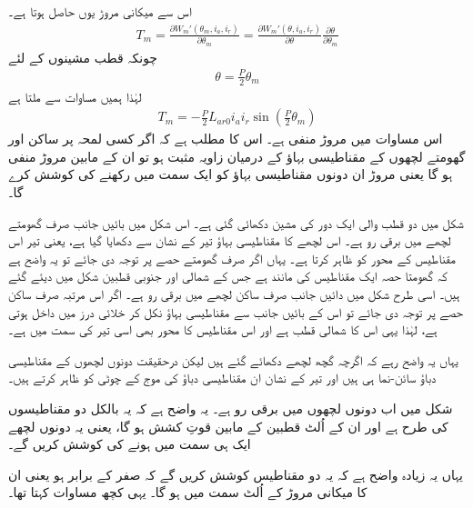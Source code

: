 اس سے میکانی مروڑ  یوں حاصل ہوتا ہے۔
\begin{align}
T_m=\frac{\partial W_m'(\theta_m,i_a,i_r)}{\partial \theta_m}=\frac{\partial W_m'(\theta,i_a,i_r)}{\partial \theta} \frac{\partial \theta}{\partial \theta_m}
\end{align}
چونکہ  قطب مشینوں کے لئے
\begin{align}
\theta=\frac{P}{2} \theta_m
\end{align}
لہٰذا ہمیں مساوات  سے ملتا ہے
\begin{align}
T_m=-\frac{P}{2} L_{ar0} i_a i_r \sin \left(\frac{P}{2} \theta_m\right)
\end{align}
اس مساوات میں مروڑ  منفی ہے۔ اس کا مطلب ہے کہ اگر کسی لمحہ پر ساکن اور گھومتے لچھوں کے مقناطیسی بہاؤ کے درمیان زاویہ مثبت ہو تو ان کے مابین مروڑ منفی ہو گا یعنی مروڑ ان دونوں مقناطیسی بہاؤ کو ایک سمت میں رکھنے کی کوشش کرے گا۔

شکل  میں دو قطب والی ایک دور کی مشین دکھائی گئی ہے۔ اس شکل میں بائیں جانب صرف گھومتے لچھے میں برقی رو ہے۔ اس لچھے کا مقناطیسی بہاؤ تیر کے نشان سے دکھایا گیا ہے، یعنی تیر اس مقناطیس کے محور کو ظاہر کرتا ہے۔ یہاں اگر صرف گھومتے حصے پر توجہ دی جائے تو یہ واضح ہے کہ گھومتا حصہ ایک مقناطیس کی مانند ہے جس کے شمالی اور جنوبی قطبین شکل میں دیئے گئے ہیں۔ اسی طرح شکل میں دائیں جانب صرف ساکن لچھے میں برقی رو ہے۔ اگر اس مرتبہ صرف ساکن حصے پر توجہ دی جائے تو اس کے بائیں جانب سے مقناطیسی بہاؤ نکل کر خلائی درز میں داخل ہوتی ہے، لہٰذا یہی اس کا شمالی قطب ہے اور اس مقناطیس کا محور بھی اسی تیر کی سمت میں ہے۔

یہاں یہ واضح رہے کہ اگرچہ گچھ لچھے دکھائے گئے ہیں  لیکن درحقیقت دونوں لچھوں کے مقناطیسی دباؤ سائن-نما ہی ہیں اور تیر کے نشان ان مقناطیسی دباؤ کی موج کے چوٹی کو ظاہر کرتے ہیں۔

شکل  میں اب دونوں لچھوں میں برقی رو ہے۔ یہ واضح ہے کہ یہ بالکل دو مقناطیسوں کی طرح ہے اور ان کے اُلٹ قطبین کے مابین قوتِ کشش ہو گا، یعنی یہ دونوں لچھے ایک ہی سمت میں ہونے کی کوشش کریں گے۔

یہاں یہ زیادہ واضح ہے کہ یہ دو مقناطیس کوشش کریں گے کہ  صفر کے برابر ہو یعنی ان کا میکانی مروڑ  کے اُلٹ سمت میں ہو گا۔ یہی کچھ مساوات  کہتا تھا۔

